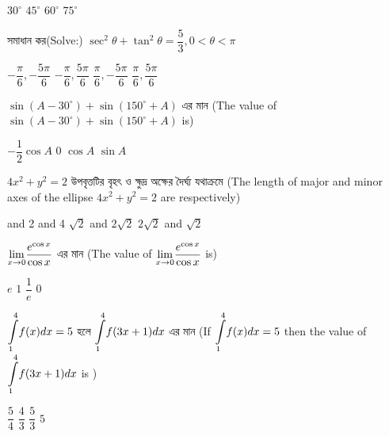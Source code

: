 \documentclass[addpoints]{exam}
\begin{document}
\begin{questions}
\begin{oneparchoices}
\choice $ 30^{\circ} $
\choice $ 45^{\circ} $
\choice $ 60^{\circ} $
\choice $ 75^{\circ} $

\end{oneparchoices}

\question  সমাধান কর(Solve:) $ \sec^{2}\theta + \tan^{2}\theta = \dfrac{5}{3}, 0<\theta<\pi $

\begin{oneparchoices}
\choice $ -\dfrac{\pi}{6}, -\dfrac{5\pi}{6} $
\choice $ -\dfrac{\pi}{6}, \dfrac{5\pi}{6} $
\choice $ \dfrac{\pi}{6}, -\dfrac{5\pi}{6} $
\choice $ \dfrac{\pi}{6}, \dfrac{5\pi}{6} $

\end{oneparchoices}

\question   $ \sin (A-30^{\circ}) + \sin (150^{\circ} +A) $ এর মান (The value of $ \sin (A-30^{\circ}) + \sin (150^{\circ} +A) $ is)

\begin{oneparchoices}
\choice $ -\dfrac{1}{2}\cos A$
\choice $ 0 $
\choice $ \cos A $
\choice $ \sin A $

\end{oneparchoices}

\question   $ 4x^{2} + y^{2} = 2 $ উপবৃত্তটির বৃহৎ ও ক্ষুদ্র অক্ষের দৈর্ঘ্য যথাক্রমে (The length of major and minor axes of the ellipse $ 4x^{2} + y^{2} = 2 $ are respectively)

\begin{oneparchoices}
 and 2
 and 4
\choice $ \sqrt{2}$ and $ 2\sqrt{2} $
\choice $ 2\sqrt{2}$ and $ \sqrt{2} $

\end{oneparchoices}

\question   $ \mathlarger{\lim_{x \to 0}} \dfrac{e^{\cos x}}{\cos x} $ এর মান (The value of $ \mathlarger{\lim_{x \to 0}} \dfrac{e^{\cos x}}{\cos x} $ is)

\begin{oneparchoices}
\choice $e$
\choice $1 $
\choice $ \dfrac{1}{e} $
\choice $ 0 $

\end{oneparchoices}


\question   $ \mathlarger{\int\limits_{1}^{4}} f(x)dx=5$ হলে $ \mathlarger{\int\limits_{1}^{4}} f(3x+1)dx$ এর মান (If $ \mathlarger{\int\limits_{1}^{4}} f(x)dx=5$ then the value of $ \mathlarger{\int\limits_{1}^{4}} f(3x+1)dx$ is )

\begin{oneparchoices}
\choice $\dfrac{5}{4}$
\choice $ \dfrac{4}{3} $
\choice $ \dfrac{5}{3} $
\choice $ 5 $


\end{oneparchoices}
\end{questions}
\end{document}

